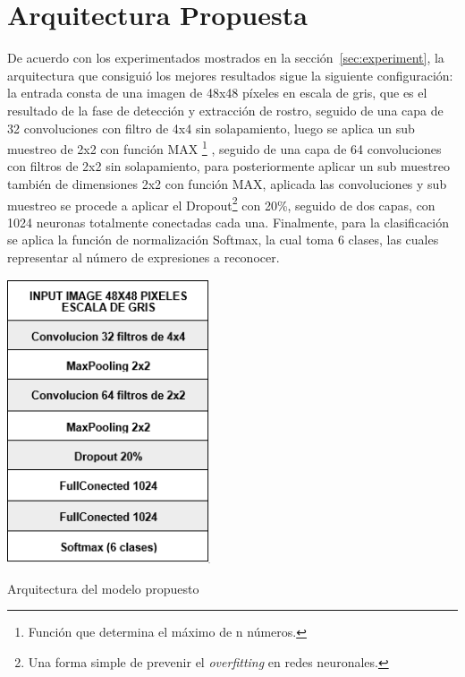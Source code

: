 \section{Arquitectura Propuesta}
\label{sec:arq_propuesta}
De acuerdo con los experimentados mostrados en la sección~\ref{sec:experiment}, la arquitectura que consiguió los mejores resultados sigue la siguiente configuración: la entrada consta de una imagen de 48x48 píxeles en escala de gris, que es el resultado de la fase de detección y extracción de rostro, seguido de una capa de 32 convoluciones con filtro de 4x4 sin solapamiento, luego se aplica un sub muestreo de 2x2 con función MAX \footnote[6]{Función que determina el máximo de n números.} , seguido de una capa de 64 convoluciones con filtros de 2x2 sin solapamiento, para posteriormente aplicar un sub muestreo también de dimensiones 2x2 con función MAX, aplicada las convoluciones y sub muestreo se procede a aplicar el Dropout\footnote[7]{Una forma simple de prevenir el \textit{overfitting} en redes neuronales.} con 20\%, seguido de dos capas, con 1024 neuronas totalmente conectadas cada una. Finalmente, para la clasificación se aplica la función de normalización Softmax, la cual toma 6 clases, las cuales representar al número de expresiones a reconocer.
\vspace{0.5cm}
\begin{table}[H]
    \centering
    \includegraphics[width=60mm]{Imagenes/tabla_arquitectura.png}
    \caption{Arquitectura del modelo propuesto}
    \label{tab:tabla_arquitectura}
\end{table}


